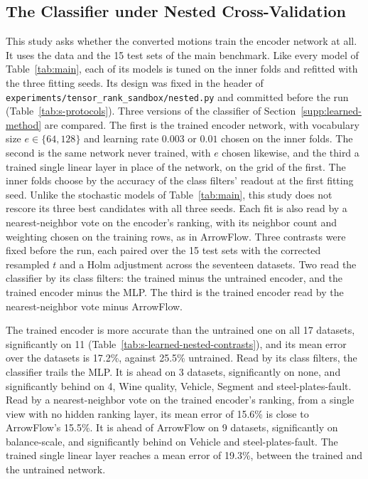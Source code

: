 \subsection{The Classifier under Nested Cross-Validation}\label{supp:learned-nested}

This study asks whether the converted motions train the encoder network at all. It uses the data and the 15 test sets of the main benchmark. Like every model of Table~\ref{tab:main}, each of its models is tuned on the inner folds and refitted with the three fitting seeds. Its design was fixed in the header of \nolinkurl{experiments/tensor_rank_sandbox/nested.py} and committed before the run (Table~\ref{tab:s-protocols}). Three versions of the classifier of Section~\ref{supp:learned-method} are compared. The first is the trained encoder network, with vocabulary size $e\in\{64,128\}$ and learning rate $0.003$ or $0.01$ chosen on the inner folds. The second is the same network never trained, with $e$ chosen likewise, and the third a trained single linear layer in place of the network, on the grid of the first. The inner folds choose by the accuracy of the class filters' readout at the first fitting seed. Unlike the stochastic models of Table~\ref{tab:main}, this study does not rescore its three best candidates with all three seeds. Each fit is also read by a nearest-neighbor vote on the encoder's ranking, with its neighbor count and weighting chosen on the training rows, as in ArrowFlow. Three contrasts were fixed before the run, each paired over the 15 test sets with the corrected resampled $t$ and a Holm adjustment across the seventeen datasets. Two read the classifier by its class filters: the trained minus the untrained encoder, and the trained encoder minus the MLP. The third is the trained encoder read by the nearest-neighbor vote minus ArrowFlow.




The trained encoder is more accurate than the untrained one on all 17 datasets, significantly on 11 (Table~\ref{tab:s-learned-nested-contrasts}), and its mean error over the datasets is 17.2\%, against 25.5\% untrained. Read by its class filters, the classifier trails the MLP. It is ahead on 3 datasets, significantly on none, and significantly behind on 4, Wine quality, Vehicle, Segment and steel-plates-fault. Read by a nearest-neighbor vote on the trained encoder's ranking, from a single view with no hidden ranking layer, its mean error of 15.6\% is close to ArrowFlow's 15.5\%. It is ahead of ArrowFlow on 9 datasets, significantly on balance-scale, and significantly behind on Vehicle and steel-plates-fault. The trained single linear layer reaches a mean error of 19.3\%, between the trained and the untrained network.

